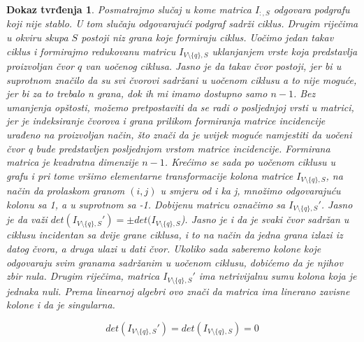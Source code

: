 \documentclass[11pt]{article}
\newtheorem*{custom_proof}{Dokaz tvrđenja}
\begin{document}
\begin{custom_proof}
		Posmatrajmo slučaj u kome matrica $I_{:,S}$ odgovara podgrafu koji nije stablo. U tom slučaju odgovarajući podgraf sadrži ciklus. 
		Drugim riječima u okviru skupa $S$ postoji niz grana koje formiraju ciklus.
		Uočimo jedan takav ciklus i formirajmo redukovanu matricu $I_{V \setminus \{q\},S}$ uklanjanjem vrste koja predstavlja proizvoljan čvor $q$ van uočenog ciklusa.
	    Jasno je da takav čvor postoji, jer bi u suprotnom značilo da su svi čvorovi sadržani u uočenom ciklusu a to nije moguće, jer bi za to trebalo n grana, dok ih mi imamo dostupno samo $n-1$. 
		Bez umanjenja opštosti, možemo pretpostaviti da se radi o posljednjoj vrsti u matrici, jer je indeksiranje čvorova i grana prilikom formiranja matrice incidencije urađeno na proizvoljan način, 
		što znači da je uvijek moguće namjestiti da uočeni čvor q bude predstavljen posljednjom vrstom matrice incidencije. 
	    Formirana matrica je kvadratna dimenzije $n - 1$. Krećimo se sada po uočenom ciklusu u grafu i pri tome vršimo elementarne transformacije kolona matrice $I_{V \setminus \{q\},S}$,
	    na način da prolaskom granom $(i,j)$ u smjeru od i ka j, množimo odgovarajuću kolonu sa 1, a u suprotnom sa -1. Dobijenu matricu označimo sa $I_{V \setminus \{q\},S}'$.
	    Jasno je da važi $det(I_{V \setminus \{q\},S}') = \pm det(I_{V \setminus \{q\},S}$). Jasno je i da je svaki čvor sadržan u ciklusu incidentan sa dvije grane ciklusa,
		i to na način da jedna grana izlazi iz datog čvora, a druga ulazi u dati čvor. Ukoliko sada saberemo kolone koje odgovaraju svim granama sadržanim u uočenom ciklusu, dobićemo da je njihov zbir nula. 
		Drugim riječima, matrica $I_{V \setminus \{q\},S}'$ ima netrivijalnu sumu kolona koja je jednaka nuli. Prema linearnoj algebri ovo znači da matrica ima linerano zavisne kolone i da je singularna.
		
		\[det(I_{V \setminus \{q\},S}') = det(I_{V \setminus \{q\},S}) = 0\]
	

\end{custom_proof}
\end{document}
